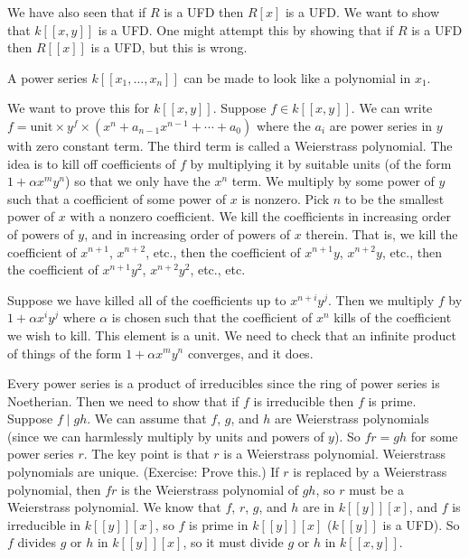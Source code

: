 \documentclass[11pt, oneside,margin=1in]{article}
\begin{document}
We have also seen that if $R$ is a UFD then $R[x]$ is a UFD. We want to show that $k[\![x,y]\!]$ is a UFD. One might attempt this by showing that if $R$ is a UFD then $R[\![x]\!]$ is a UFD, but this is wrong.

\begin{theorem}\label{}
A power series $k[\![x_1,\hdots,x_n]\!]$ can be made to look like a polynomial in $x_1$.
\end{theorem}

We want to prove this for $k[\![x,y]\!]$. Suppose $f\in k[\![x,y]\!]$. We can write $f = \textrm{unit} \times y^f \times ( x^n + a_{n-1}x^{n-1} +\cdots + a_0)$ where the $a_i$ are power series in $y$ with zero constant term. The third term is called a Weierstrass polynomial. The idea is to kill off coefficients of $f$ by multiplying it by suitable units (of the form $1+\alpha x^my^n$) so that we only have the $x^n$ term. We multiply by some power of $y$ such that a coefficient of some power of $x$ is nonzero. Pick $n$ to be the smallest power of $x$ with a nonzero coefficient. We kill the coefficients in increasing order of powers of $y$, and in increasing order of powers of $x$ therein. That is, we kill the coefficient of $x^{n+1}$, $x^{n+2}$, etc., then the coefficient of $x^{n+1}y$, $x^{n+2}y$, etc., then the coefficient of $x^{n+1}y^2$, $x^{n+2}y^2$, etc., etc. 

Suppose we have killed all of the coefficients up to $x^{n+i}y^j$. Then we multiply $f$ by $1+\alpha x^iy^j$ where $\alpha$ is chosen such that the coefficient of $x^n$ kills of the coefficient we wish to kill. This element is a unit. We need to check that an infinite product of things of the form $1 + \alpha x^m y^n$ converges, and it does. 

Every power series is a product of irreducibles since the ring of power series is Noetherian. Then we need to show that if $f$ is irreducible then $f$ is prime. Suppose $f\mid gh$. We can assume that $f$, $g$, and $h$ are Weierstrass polynomials (since we can harmlessly multiply by units and powers of $y$). So $fr = gh$ for some power series $r$. The key point is that $r$ is a Weierstrass polynomial. Weierstrass polynomials are unique. (Exercise: Prove this.) If $r$ is replaced by a Weierstrass polynomial, then $fr$ is the Weierstrass polynomial of $gh$, so $r$ must be a Weierstrass polynomial. We know that $f$, $r$, $g$, and $h$ are in $ k[\![y]\!][x]$, and $f$ is irreducible in $k[\![y]\!][x]$, so $f$ is prime in $k[\![y]\!][x]$ ($k[\![y]\!]$ is a UFD). So $f$ divides $g$ or $h$ in $k[\![y]\!][x]$, so it must divide $g$ or $h$ in $k[\![x,y]\!]$.
\end{document}
